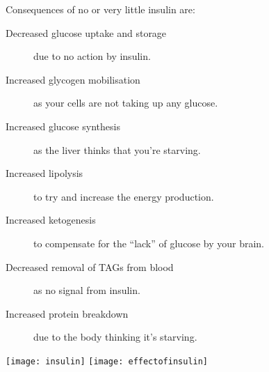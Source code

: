 Consequences of no or very little insulin are:
\begin{description}
\item[Decreased glucose uptake and storage] due to no action by insulin.
\item[Increased glycogen mobilisation] as your cells are not taking up any glucose.
\item[Increased glucose synthesis] as the liver thinks that you're starving.
\item[Increased lipolysis] to try and increase the energy production.
\item[Increased ketogenesis] to compensate for the ``lack'' of glucose by your brain.
\item[Decreased removal of TAGs from blood] as no signal from insulin.
\item[Increased protein breakdown] due to the body thinking it's starving.
\end{description}

\begin{center}
\texttt{[image: insulin]}
\texttt{[image: effectofinsulin]}
\end{center}


















































